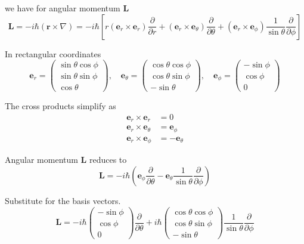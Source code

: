 we have for angular momentum $\mathbf L$
\begin{equation*}
\mathbf L=-i\hbar(\mathbf r\times\nabla)
=-i\hbar\left[
r(\mathbf e_r\times\mathbf e_r)\frac{\partial}{\partial r}
+(\mathbf e_r\times\mathbf e_\theta)\frac{\partial}{\partial\theta}
+(\mathbf e_r\times\mathbf e_\phi)\frac{1}{\sin\theta}\frac{\partial}{\partial\phi}
\right]
\end{equation*}

In rectangular coordinates
\begin{equation*}
\mathbf e_r=\begin{pmatrix}
\sin\theta\cos\phi
\\
\sin\theta\sin\phi
\\
\cos\theta
\end{pmatrix},\quad
\mathbf e_\theta=\begin{pmatrix}
\cos\theta\cos\phi
\\
\cos\theta\sin\phi
\\
-\sin\theta
\end{pmatrix},\quad
\mathbf e_\phi=\begin{pmatrix}
-\sin\phi
\\
\cos\phi
\\
0
\end{pmatrix}
\end{equation*}

The cross products simplify as
\begin{align*}
\mathbf e_r\times\mathbf e_r&=0
\\
\mathbf e_r\times\mathbf e_\theta&=\mathbf e_\phi
\\
\mathbf e_r\times\mathbf e_\phi&=-\mathbf e_\theta
\end{align*}

Angular momentum $\mathbf L$ reduces to
\begin{equation*}
\mathbf L=-i\hbar\left(
\mathbf e_\phi\frac{\partial}{\partial\theta}
-\mathbf e_\theta\frac{1}{\sin\theta}\frac{\partial}{\partial\phi}
\right)
\end{equation*}

Substitute for the basis vectors.
\begin{equation*}
\mathbf L=-i\hbar
\begin{pmatrix}
-\sin\phi
\\
\cos\phi
\\
0
\end{pmatrix}
\frac{\partial}{\partial\theta}
+i\hbar
\begin{pmatrix}
\cos\theta\cos\phi
\\
\cos\theta\sin\phi
\\
-\sin\theta
\end{pmatrix}
\frac{1}{\sin\theta}\frac{\partial}{\partial\phi}
\end{equation*}

